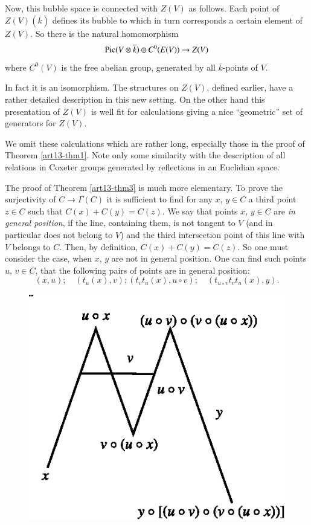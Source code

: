 Now, this bubble space is connected with $Z(V)$ as follows. Each point of $Z(V)(\overline{k})$ defines its bubble to which in turn corresponds a certain element of $Z(V)$. So there is the natural homomorphism
$$
\operatorname{\mathrm{Pic}} (V\otimes \overline{k})\oplus C^{0}(E(V))\to Z(V)
$$
where $C^{0}(V)$ is the free abelian group, generated by all $\overline{k}$-points of $V$.

In fact it is an isomorphism. The structures on $Z(V)$, defined earlier, have a rather detailed description in this new setting. On the other hand this presentation of $Z(V)$ is well fit for calculations giving a nice ``geometric'' set of generators for $Z(V)$.

We omit these calculations which are rather long, especially those in the proof of Theorem \ref{art13-thm1}. Note only some similarity with the description of all relations in Coxeter groups generated by reflections in an Euclidian space.

The proof of Theorem \ref{art13-thm3} is much more elementary. To prove the surjectivity of $C\to \Gamma(C)$ it is sufficient to find for any $x$, $y\in C$ a third point $z\in C$ such that $C(x)+C(y)=C(z)$. We say that points $x$, $y\in C$ are {\em in general position}, if the line, containing them, is not tangent to $V$ (and in particular does not belong to $V$) and the third intersection point of this line with $V$ belongs to $C$. Then, by definition, $C(x)+C(y)=C(z)$. So one must consider the case, when $x$, $y$ are not in general position. One can find such points\pageoriginale $u$, $v\in C$, that the following pairs of points are in general position:
$$
(x,u);\quad (t_{u}(x),v); (t_{v}t_{u}(x),u\circ v);\quad (t_{u\circ v}t_{v}t_{u}(x),y).
$$
\begin{figure}[H]
\centering
\includegraphics{figures/fig1.eps}
\end{figure}

